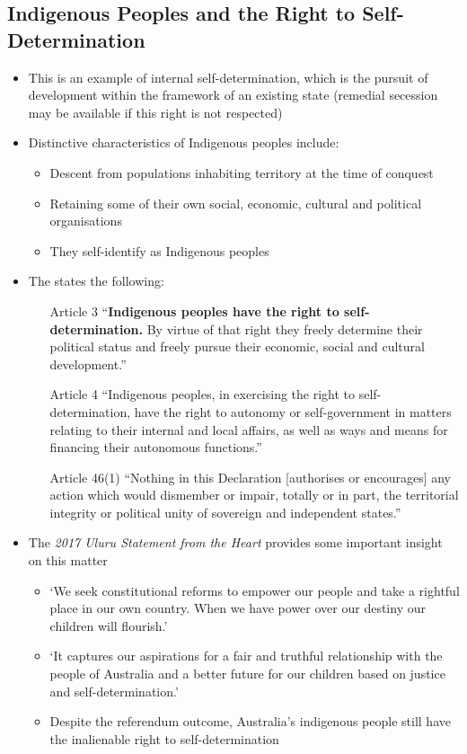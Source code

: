 \subsection{Indigenous Peoples and the Right to Self-Determination}
\begin{itemize}
    \item This is an example of internal self-determination, which is the pursuit of development within the framework of an existing state (remedial secession may be available if this right is not respected)
    \item Distinctive characteristics of Indigenous peoples include:
    \begin{itemize}
        \item Descent from populations inhabiting territory at the time of conquest
        \item Retaining some of their own social, economic, cultural and political organisations
        \item They self-identify as Indigenous peoples
    \end{itemize}
    \item The  states the following:
    \begin{itemize}
        \item[Article 3] ``\textbf{Indigenous peoples have the right to self-determination.} By virtue of that right they freely determine their political status and freely pursue their economic, social and cultural development.''
        \item[Article 4] ``Indigenous peoples, in exercising the right to self-determination, have the right to autonomy or self-government in matters relating to their internal and local affairs, as well as ways and means for financing their autonomous functions.''
        \item[Article 46(1)] ``Nothing in this Declaration [authorises or encourages] any action which would dismember or impair, totally or in part, the territorial integrity or political unity of sovereign and independent states.''
    \end{itemize}
    \item The \textit{2017 Uluru Statement from the Heart} provides some important insight on this matter
    \begin{itemize}
        \item `We seek constitutional reforms to empower our people and take a rightful place in our own country. When we have power over our destiny our children will flourish.'
        \item `It captures our aspirations for a fair and truthful relationship with the people of Australia and a better future for our children based on justice and self-determination.'
        \item Despite the referendum outcome, Australia's indigenous people still have the inalienable right to self-determination
    \end{itemize}
\end{itemize}